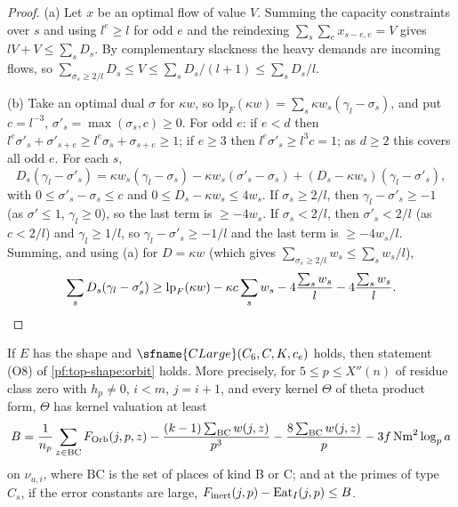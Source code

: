 \begin{proof}
(a) Let $x$ be an optimal flow of value $V$. Summing the capacity constraints over $s$ and using $l^e\ge l$ for odd $e$ and
the reindexing $\sum_s\sum_ex_{s-e,e}=V$ gives $lV+V\le\sum_sD_s$. By complementary slackness the heavy demands are
incoming flows, so $\sum_{\sigma_s\ge2/l}D_s\le V\le\sum_sD_s/(l+1)\le\sum_sD_s/l$.

(b) Take an optimal dual $\sigma$ for $\kappa w$, so $\mathrm{lp}_F(\kappa w)=\sum_s\kappa w_s(\gamma_l-\sigma_s)$, and put
$c=l^{-3}$, $\sigma'_s=\max(\sigma_s,c)\ge0$. For odd $e$: if $e<d$ then $l^e\sigma'_s+\sigma'_{s+e}\ge l^e\sigma_s+\sigma_{s+e}\ge1$; if
$e\ge3$ then $l^e\sigma'_s\ge l^3c=1$; as $d\ge2$ this covers all odd $e$. For each $s$,
\[
D_s(\gamma_l-\sigma'_s)=\kappa w_s(\gamma_l-\sigma_s)-\kappa w_s(\sigma'_s-\sigma_s)+(D_s-\kappa w_s)(\gamma_l-\sigma'_s),
\]
with $0\le\sigma'_s-\sigma_s\le c$ and $0\le D_s-\kappa w_s\le4w_s$. If $\sigma_s\ge2/l$, then $\gamma_l-\sigma'_s\ge-1$ (as
$\sigma'\le1$, $\gamma_l\ge0$), so the last term is $\ge-4w_s$. If $\sigma_s<2/l$, then $\sigma'_s<2/l$ (as $c<2/l$) and
$\gamma_l\ge1/l$, so $\gamma_l-\sigma'_s\ge-1/l$ and the last term is $\ge-4w_s/l$. Summing, and using (a) for $D=\kappa w$
(which gives $\sum_{\sigma_s\ge2/l}w_s\le\sum_sw_s/l$),
\[
\sum_sD_s(\gamma_l-\sigma'_s)\ge\mathrm{lp}_F(\kappa w)-\kappa c\sum_sw_s-4\frac{\sum_sw_s}l-4\frac{\sum_sw_s}l .
\qedhere
\]
\end{proof}

\begin{proposition}\label{pf:top-shape:o8}
If $E$ has the shape and $\sfname{CLarge}(C_6,C,K,c_e)$ holds, then statement (O8) of \cref{pf:top-shape:orbit} holds.
More precisely, for $5\le p\le X''(n)$ of residue class zero with $h_p\ne0$, $i<m$, $j=i+1$, and every kernel $\Theta$ of
theta product form, $\Theta$ has kernel valuation at least
\[
B=\frac1{n_p}\sum_{z\in\mathrm{BC}}F_{\rm Orb}(j,p,z)-\frac{(k-1)\sum_{\rm BC}w(j,z)}{p^3}-\frac{8\sum_{\rm BC}w(j,z)}p
-3f\,\mathrm{Nm}^2\log_pa
\]
on $\nu_{u,i}$, where $\mathrm{BC}$ is the set of places of kind B or C; and at the primes of type $C_s$, if the error
constants are large, $F_{\rm inert}(j,p)-\mathrm{Eat}_I(j,p)\le B$.
\end{proposition}


